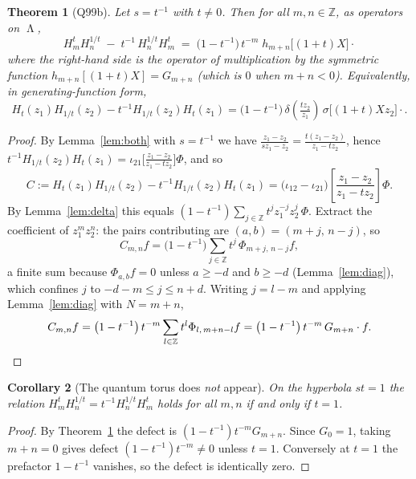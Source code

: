\documentclass[11pt]{article}
\newtheorem{theorem}{Theorem}[section]
\newtheorem{corollary}[theorem]{Corollary}
\theoremstyle{definition}
\DeclareMathOperator{\Lam}{\Lambda}
\newcommand{\Z}{\mathbb{Z}}
\newcommand{\Hop}{H}
\newcommand{\iotain}{\iota_{12}}
\newcommand{\iotaout}{\iota_{21}}
\begin{document}
\begin{theorem}[Q99b]\label{thm:B}
Let $s=t^{-1}$ with $t\neq0$. Then for all $m,n\in\Z$, as operators on $\Lam$,
\[
  \boxed{\;
  \Hop^{t}_m \Hop^{1/t}_n \;-\; t^{-1}\,\Hop^{1/t}_n \Hop^{t}_m
  \;=\;\bigl(1-t^{-1}\bigr)\,t^{-m}\;h_{m+n}\bigl[(1+t)X\bigr]\cdot\;}
\]
where the right-hand side is the operator of multiplication by the symmetric function
$h_{m+n}[(1+t)X]=G_{m+n}$ (which is $0$ when $m+n<0$).
Equivalently, in generating-function form,
\[
  \Hop_t(z_1)\Hop_{1/t}(z_2)-t^{-1}\Hop_{1/t}(z_2)\Hop_t(z_1)
  =\bigl(1-t^{-1}\bigr)\,\delta\!\left(\tfrac{tz_2}{z_1}\right)\,\sigma\bigl[(1+t)Xz_2\bigr]\cdot .
\]
\end{theorem}

\begin{proof}
By Lemma~\ref{lem:both} with $s=t^{-1}$ we have
$\frac{z_1-z_2}{sz_1-z_2}=\frac{t(z_1-z_2)}{z_1-tz_2}$, hence
$t^{-1}\Hop_{1/t}(z_2)\Hop_t(z_1)=\iotaout\bigl[\frac{z_1-z_2}{z_1-tz_2}\bigr]\Phi$, and so
\[
  C:=\Hop_t(z_1)\Hop_{1/t}(z_2)-t^{-1}\Hop_{1/t}(z_2)\Hop_t(z_1)
  =\bigl(\iotain-\iotaout\bigr)\!\left[\frac{z_1-z_2}{z_1-tz_2}\right]\Phi .
\]
By Lemma~\ref{lem:delta} this equals $(1-t^{-1})\sum_{j\in\Z}t^jz_1^{-j}z_2^{j}\,\Phi$.
Extract the coefficient of $z_1^mz_2^n$: the pairs contributing are $(a,b)=(m+j,\,n-j)$, so
\[
  C_{m,n}f=\bigl(1-t^{-1}\bigr)\sum_{j\in\Z}t^{j}\,\Phi_{m+j,\,n-j}f ,
\]
a finite sum because $\Phi_{a,b}f=0$ unless $a\ge-d$ and $b\ge-d$ (Lemma~\ref{lem:diag}),
which confines $j$ to $-d-m\le j\le n+d$. Writing $j=l-m$ and applying Lemma~\ref{lem:diag}
with $N=m+n$,
\[
  C_{m,n}f=\bigl(1-t^{-1}\bigr)\,t^{-m}\sum_{l\in\Z}t^{l}\Phi_{l,\,m+n-l}f
  =\bigl(1-t^{-1}\bigr)\,t^{-m}\,G_{m+n}\cdot f . \qedhere
\]
\end{proof}

\begin{corollary}[The quantum torus does \emph{not} appear]\label{cor:notorus}
On the hyperbola $st=1$ the relation
$\Hop^t_m\Hop^{1/t}_n=t^{-1}\Hop^{1/t}_n\Hop^t_m$ holds for all $m,n$ if and only if $t=1$.
\end{corollary}

\begin{proof}
By Theorem~\ref{thm:B} the defect is $(1-t^{-1})t^{-m}G_{m+n}$. Since $G_0=1$, taking
$m+n=0$ gives defect $(1-t^{-1})t^{-m}\neq0$ unless $t=1$. Conversely at $t=1$ the prefactor
$1-t^{-1}$ vanishes, so the defect is identically zero.
\end{proof}
\end{document}
